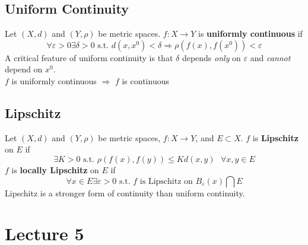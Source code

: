 \documentclass{article}
\newcommand{\intersect}{\bigcap}
\begin{document}
\subsection{Uniform Continuity}
Let $(X,d)$ and $(Y,\rho)$ be metric spaces. $f:X\rightarrow Y$ is \textbf{uniformly continuous} if 
\[
	\forall\varepsilon>0\exists\delta>0\text{ s.t. }d(x,x^0)<\delta\Rightarrow\rho(f(x),f(x^0))<\varepsilon
\]
A critical feature of uniform continuity is that $\delta$ depends \textit{only} on $\varepsilon$ and \textit{cannot} depend on $x^0$.
\smallskip \\
$f$ is uniformly continuous $\Rightarrow$ $f$ is continuous


\subsection{Lipschitz}
Let $(X,d)$ and $(Y,\rho)$ be metric spaces, $f:X\rightarrow Y$, and $E\subset X$. $f$ is \textbf{Lipschitz} on $E$ if
\[
	\exists K>0\text{ s.t. }\rho(f(x),f(y))\leq K d(x,y)\text{ }\forall x,y\in E
\]
$f$ is \textbf{locally Lipschitz} on $E$ if
\[
	\forall x\in E\exists\varepsilon>0\text{ s.t. }f\text{ is Lipschitz on }B_\varepsilon(x)\intersect E
\]
Lipschitz is a stronger form of continuity than uniform continuity.


\section{Lecture 5}
\end{document}
